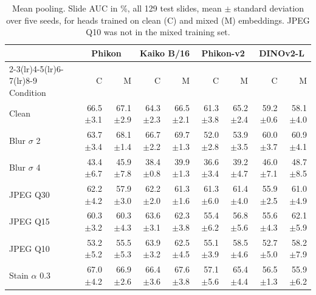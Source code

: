 \begin{table}[H]\centering\small
\caption{Mean pooling. Slide AUC in \%, all 129 test slides, mean $\pm$ standard deviation over five seeds, for heads trained on clean (C) and mixed (M) embeddings. JPEG Q10 was not in the mixed training set.}
\label{tab:app-mean}
\setlength{\tabcolsep}{3.5pt}
\begin{tabular}{lrrrrrrrr}
\toprule
 & \multicolumn{2}{c}{Phikon} & \multicolumn{2}{c}{Kaiko B/16} & \multicolumn{2}{c}{Phikon-v2} & \multicolumn{2}{c}{DINOv2-L}\\
\cmidrule(lr){2-3}\cmidrule(lr){4-5}\cmidrule(lr){6-7}\cmidrule(lr){8-9}
Condition & C & M & C & M & C & M & C & M\\
\midrule
Clean & 66.5{\scriptsize$\pm$3.1} & 67.1{\scriptsize$\pm$2.9} & 64.3{\scriptsize$\pm$2.3} & 66.5{\scriptsize$\pm$2.1} & 61.3{\scriptsize$\pm$3.8} & 65.2{\scriptsize$\pm$2.4} & 59.2{\scriptsize$\pm$0.6} & 58.1{\scriptsize$\pm$4.0}\\
Blur $\sigma$ 2 & 63.7{\scriptsize$\pm$3.4} & 68.1{\scriptsize$\pm$1.4} & 66.7{\scriptsize$\pm$2.2} & 69.7{\scriptsize$\pm$1.3} & 52.0{\scriptsize$\pm$2.8} & 53.9{\scriptsize$\pm$3.5} & 60.0{\scriptsize$\pm$3.7} & 60.9{\scriptsize$\pm$4.1}\\
Blur $\sigma$ 4 & 43.4{\scriptsize$\pm$6.7} & 45.9{\scriptsize$\pm$7.8} & 38.4{\scriptsize$\pm$0.8} & 39.9{\scriptsize$\pm$1.3} & 36.6{\scriptsize$\pm$3.4} & 39.2{\scriptsize$\pm$4.7} & 46.0{\scriptsize$\pm$7.1} & 48.7{\scriptsize$\pm$8.5}\\
JPEG Q30 & 62.2{\scriptsize$\pm$4.2} & 57.9{\scriptsize$\pm$3.0} & 62.2{\scriptsize$\pm$2.0} & 61.3{\scriptsize$\pm$1.6} & 61.3{\scriptsize$\pm$6.0} & 61.4{\scriptsize$\pm$4.0} & 55.9{\scriptsize$\pm$2.5} & 61.0{\scriptsize$\pm$4.9}\\
JPEG Q15 & 60.3{\scriptsize$\pm$3.2} & 60.3{\scriptsize$\pm$4.3} & 63.6{\scriptsize$\pm$3.1} & 62.3{\scriptsize$\pm$3.8} & 55.4{\scriptsize$\pm$6.2} & 56.8{\scriptsize$\pm$5.6} & 55.6{\scriptsize$\pm$4.3} & 62.1{\scriptsize$\pm$5.9}\\
JPEG Q10 & 53.2{\scriptsize$\pm$5.2} & 55.5{\scriptsize$\pm$5.3} & 63.9{\scriptsize$\pm$3.2} & 62.5{\scriptsize$\pm$4.5} & 55.1{\scriptsize$\pm$3.9} & 58.5{\scriptsize$\pm$4.6} & 52.7{\scriptsize$\pm$5.0} & 58.2{\scriptsize$\pm$7.9}\\
Stain $\alpha$ 0.3 & 67.0{\scriptsize$\pm$4.2} & 66.9{\scriptsize$\pm$2.6} & 66.4{\scriptsize$\pm$3.6} & 67.6{\scriptsize$\pm$3.8} & 57.1{\scriptsize$\pm$5.6} & 65.4{\scriptsize$\pm$4.4} & 56.5{\scriptsize$\pm$1.3} & 55.9{\scriptsize$\pm$6.2}\\
\bottomrule
\end{tabular}
\end{table}

